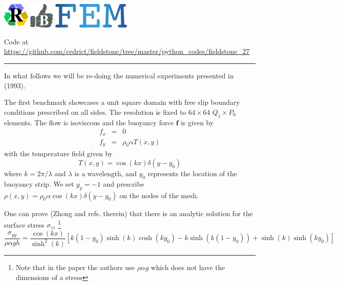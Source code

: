 \includegraphics[height=1.25cm]{images/pictograms/replication}
\includegraphics[height=1.25cm]{images/pictograms/benchmark}
\includegraphics[height=1.25cm]{images/pictograms/FEM}




\begin{center}
Code at \url{https://github.com/cedrict/fieldstone/tree/master/python_codes/fieldstone_27}
\end{center}

\par\noindent\rule{\textwidth}{0.4pt}


In what follows we will be re-doing the numerical experiments presented in 
\textcite{zhgh93} (1993).

The first benchmark showcases a unit square domain with free slip 
boundary conditions prescribed on all sides.
The resolution is fixed to $64\times64$ $Q_1 \times P_0$ elements. 
The flow is isoviscous and the buoyancy force ${\bm f}$ is given by 
\begin{eqnarray}
f_x &=& 0 \nonumber\\
f_y &=& \rho_0 \alpha T(x,y) \nonumber
\end{eqnarray}
with the temperature field given by 
\[
T(x,y) = \cos(kx) \delta(y-y_0)
\]
where $k=2\pi/\lambda$ and $\lambda$ is a wavelength, 
and $y_0$ represents the location of the buoyancy strip.
We set $g_y=-1$ and prescribe $\rho(x,y)=\rho_0 \alpha \cos(kx) \delta(y-y_0)$ on the nodes
of the mesh.

One can prove (Zhong \etal \cite{zhgh93} and refs. therein) that 
there is an analytic solution for the surface stress $\sigma_{zz}$
\footnote{Note that in the paper the authors use $\rho \alpha g$ which does not have the 
dimensions of a stress}
\[
\frac{\sigma_{yy}}{\rho \alpha g h} =
\frac{\cos (kx)}{\sinh^2(k)}
\left[
k(1-y_0)\sinh(k) \cosh(ky_0)-k \sinh(k(1-y_0))
+\sinh(k) \sinh(ky_0)
\right]
\]

